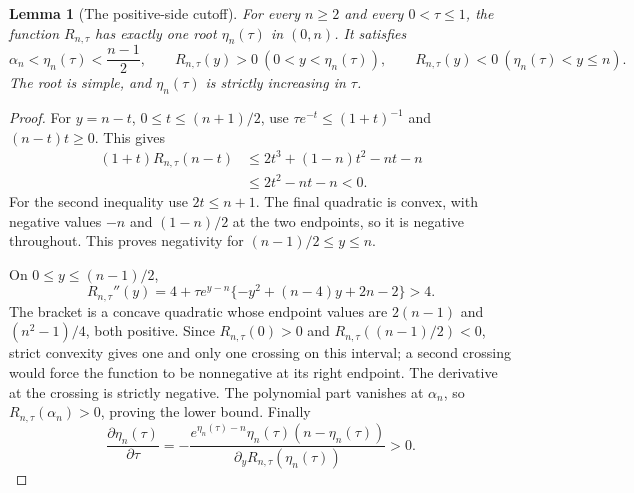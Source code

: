 \documentclass[11pt,a4paper]{article}
\newtheorem{lemma}[theorem]{Lemma}
\theoremstyle{definition}
\theoremstyle{remark}
\numberwithin{equation}{section}
\begin{document}
\begin{lemma}[The positive-side cutoff]\label{opt:lem:cutoff}
For every $n\geq2$ and every $0<\tau\leq1$, the function
$R_{n,\tau}$ has exactly one root $\eta_n(\tau)$ in $(0,n)$.
It satisfies
\[
 \alpha_n<\eta_n(\tau)<\frac{n-1}{2},
 \qquad
 R_{n,\tau}(y)>0\ (0<y<\eta_n(\tau)),\qquad
 R_{n,\tau}(y)<0\ (\eta_n(\tau)<y\leq n).
\]
The root is simple, and $\eta_n(\tau)$ is strictly increasing in $\tau$.
\end{lemma}
\begin{proof}
For $y=n-t$, $0\leq t\leq(n+1)/2$, use
$\tau e^{-t}\leq(1+t)^{-1}$ and $(n-t)t\geq0$. This gives
\begin{align*}
 (1+t)R_{n,\tau}(n-t)
 &\leq2t^3+(1-n)t^2-nt-n\\
 &\leq2t^2-nt-n<0.
\end{align*}
For the second inequality use $2t\leq n+1$. The final quadratic is
convex, with negative values $-n$ and $(1-n)/2$ at the two endpoints,
so it is negative throughout. This proves negativity for
$(n-1)/2\leq y\leq n$.

On $0\leq y\leq(n-1)/2$,
\[
 R_{n,\tau}''(y)
 =4+\tau e^{y-n}\{-y^2+(n-4)y+2n-2\}>4.
\]
The bracket is a concave quadratic whose endpoint values are
$2(n-1)$ and $(n^2-1)/4$, both positive. Since $R_{n,\tau}(0)>0$
and $R_{n,\tau}((n-1)/2)<0$, strict convexity gives one and only one
crossing on this interval; a second crossing would force the function
to be nonnegative at its right endpoint. The derivative at the crossing
is strictly negative. The polynomial part vanishes at $\alpha_n$, so
$R_{n,\tau}(\alpha_n)>0$, proving the lower bound. Finally
\[
 \frac{\partial\eta_n(\tau)}{\partial\tau}
 =-\frac{e^{\eta_n(\tau)-n}\eta_n(\tau)(n-\eta_n(\tau))}
 {\partial_yR_{n,\tau}(\eta_n(\tau))}>0.
\]
\end{proof}
\end{document}
